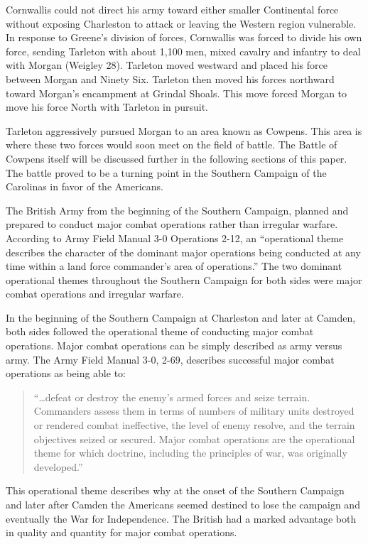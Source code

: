 Cornwallis could not direct his army toward either smaller Continental force without exposing Charleston to attack or leaving the Western region vulnerable. In response to Greene's division of forces, Cornwallis was forced to divide his own force, sending Tarleton with about 1,100 men, mixed cavalry and infantry to deal with Morgan (Weigley 28).   Tarleton moved westward and placed his force between Morgan and Ninety Six.  Tarleton then moved his forces northward toward Morgan's encampment at Grindal Shoals.   This move forced Morgan to move his force North with Tarleton in pursuit.  

Tarleton aggressively pursued Morgan to an area known as Cowpens.  This area is where these two forces would soon meet on the field of battle.  The Battle of Cowpens itself will be discussed further in the following sections of this paper.  The battle proved to be a turning point in the Southern Campaign of the Carolinas in favor of the Americans.

The British Army from the beginning of the Southern Campaign, planned and prepared to conduct major combat operations rather than irregular warfare.  According to Army Field Manual 3-0 Operations 2-12, an ``operational theme describes the character of the dominant major operations being conducted at any time within a land force commander's area of operations.''  The two dominant operational themes throughout the Southern Campaign for both sides were major combat operations and irregular warfare.

In the beginning of the Southern Campaign at Charleston and later at Camden, both sides followed the operational theme of conducting major combat operations.  Major combat operations can be simply described as army versus army.  The Army Field Manual 3-0, 2-69, describes successful major combat operations as being able to: 

\begin{quote}
``\dots defeat or destroy the enemy's armed forces and seize terrain. Commanders assess them in terms of numbers of military units destroyed or rendered combat ineffective, the level of enemy resolve, and the terrain objectives seized or secured. Major combat operations are the operational theme for which doctrine, including the principles of war, was originally developed.''
\end{quote}

This operational theme describes why at the onset of the Southern Campaign and later after Camden the Americans seemed destined to lose the campaign and eventually the War for Independence.  The British had a marked advantage both in quality and quantity for major combat operations.

